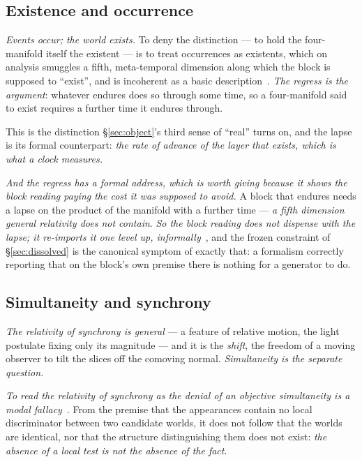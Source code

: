 \documentclass[11pt,a4paper]{article}
\theoremstyle{plain}
\theoremstyle{definition}
\begin{document}
\subsection{Existence and occurrence}

\emph{Events occur; the world exists.} To deny the distinction --- to hold the four-manifold itself the
existent --- is to treat occurrences as existents, which on analysis smuggles a fifth, meta-temporal dimension
along which the block is supposed to ``exist'', and is incoherent as a basic
description~\cite{JanzenModernParallax}. \emph{The regress is the argument}: whatever endures does so through
some time, so a four-manifold said to exist requires a further time it endures through.

This is the distinction \S\ref{sec:object}'s third sense of ``real'' turns on, and the lapse is its formal
counterpart: \emph{the rate of advance of the layer that exists, which is what a clock measures.}

\emph{And the regress has a formal address, which is worth giving because it shows the block reading paying
the cost it was supposed to avoid.} A block that endures needs a lapse on the product of the manifold with a
further time --- \emph{a fifth dimension general relativity does not contain}. \emph{So the block reading
does not dispense with the lapse; it re-imports it one level up, informally}~\cite{JanzenCRframework}, and the
frozen constraint of \S\ref{sec:dissolved} is the canonical symptom of exactly that: a formalism correctly
reporting that on the block's own premise there is nothing for a generator to do.

\subsection{Simultaneity and synchrony}

\emph{The relativity of synchrony is general} --- a feature of relative motion, the light postulate fixing
only its magnitude --- and it is the \emph{shift}, the freedom of a moving observer to tilt the slices off the
comoving normal. \emph{Simultaneity is the separate question.}

\emph{To read the relativity of synchrony as the denial of an objective simultaneity is a modal
fallacy}~\cite{JanzenModernParallax, JanzenShadowExistence}. From the premise that the appearances contain no
local discriminator between two candidate worlds, it does not follow that the worlds are identical, nor that
the structure distinguishing them does not exist: \emph{the absence of a local test is not the absence of the
fact}.
\end{document}
